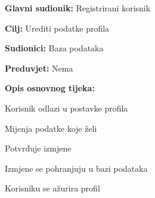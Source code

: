 					\noindent {}
					\begin{packed_item}
						
						\item \textbf{Glavni sudionik: }Registrirani korisnik
						\item  \textbf{Cilj:} Urediti podatke profila
						\item  \textbf{Sudionici:} Baza podataka
						\item  \textbf{Preduvjet:} Nema
						\item  \textbf{Opis osnovnog tijeka:}
						
						\item[] \begin{packed_enum}
							\item Korisnik odlazi u postavke profila
							\item Mijenja podatke koje želi
							\item Potvrđuje izmjene
							\item Izmjene se pohranjuju u bazi podataka
							\item Korisniku se ažurira profil
						\end{packed_enum}
						
					\end{packed_item}
				
